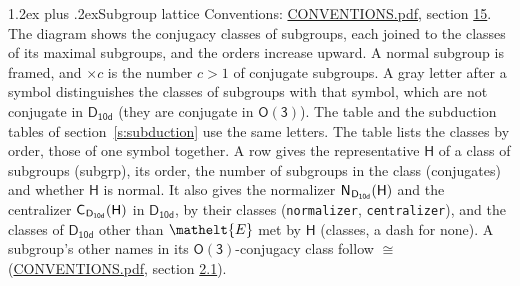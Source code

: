 \documentclass[10pt,a4paper]{article}
\makeatletter
\renewcommand\section{\@startsection{section}{1}{\z@}{-3ex plus -1ex minus -.2ex}%
  {1.2ex plus .2ex}{\normalfont\large\sffamily\bfseries\color{parttitle}}}
\numberwithin{equation}{section}
\newcommand{\eltfont}[1]{{\let\sigma\eltsigma\mathelt{#1}}}
\newcommand{\grp}[1]{\mathsf{#1}}
\newcommand{\cls}[1]{\eltfont{#1}}
\newcommand{\samecls}{\cong}
\newcommand{\hairsp}{\mkern1mu}
\makeatother
\begin{document}
\section{Subgroup lattice}\label{s:subgroups}
Conventions: \href{../../CONVENTIONS.pdf}{CONVENTIONS.pdf}, section \href{../../CONVENTIONS.pdf\#conv.15}{15}.
The diagram shows the conjugacy classes of subgroups, each joined to the classes of its maximal subgroups, and the orders increase upward. A normal subgroup is framed, and ${\times}c$ is the number $c > 1$ of conjugate subgroups. A gray letter after a symbol distinguishes the classes of subgroups with that symbol, which are not conjugate in $\grp{D_{10d}}$ (they are conjugate in \href{O3.pdf}{$\grp{O(3)}$}). The table and the subduction tables of section~\ref{s:subduction} use the same letters. The table lists the classes by order, those of one symbol together. \label{n:group.H}\label{n:head.subgroup}\label{n:head.order}\label{n:head.conjugates}\label{n:head.normal}A row gives the representative $\grp{H}$ of a class of subgroups (subgrp), its order, the number of subgroups in the class (conjugates) and whether $\grp{H}$ is normal. \label{n:group.normalizer}\label{n:group.centralizer}\label{n:head.classes}It also gives the normalizer $\grp{N}_{\hairsp \grp{D_{10d}}}(\grp{H})$ and the centralizer $\grp{C}_{\hairsp \grp{D_{10d}}}(\grp{H})$ in $\grp{D_{10d}}$, by their classes (\texttt{normalizer}, \texttt{centralizer}), and the classes of $\grp{D_{10d}}$ other than $\cls{E}$ met by $\grp{H}$ (classes, a dash for none). A subgroup's other names in its \href{O3.pdf}{$\grp{O(3)}$}-conjugacy class follow $\samecls$ (\href{../../CONVENTIONS.pdf}{CONVENTIONS.pdf}, section \href{../../CONVENTIONS.pdf\#conv.2.1}{2.1}).
\end{document}

